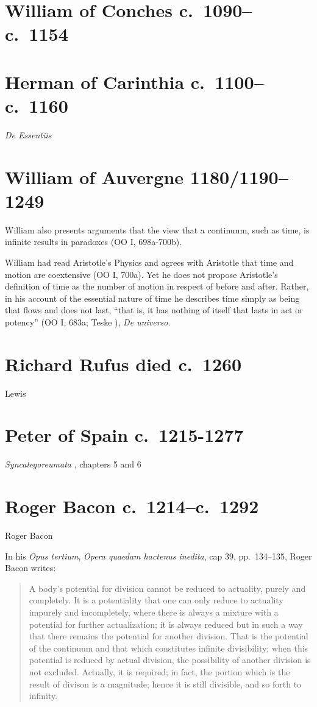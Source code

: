\documentclass{amsart}
\theoremstyle{definition}
\begin{document}
\section{William of Conches c.~1090--c.~1154}

\section{Herman of Carinthia c.~1100--c.~1160}
{\em De Essentiis} \cite[p.~252]{essentiis}


\section{William of Auvergne 1180/1190--1249}
William also presents arguments that the view that a continuum, such as time, is infinite results in paradoxes (OO I, 698a-700b).

William had read Aristotle's Physics and agrees with Aristotle that time and motion are coextensive (OO I, 700a). Yet he does not propose Aristotle's definition of time as the number of motion in respect of before and after. Rather, in his account of the essential nature of time he describes time simply as being that flows and does not last, ``that is, it has nothing of itself that lasts in act or potency'' (OO I, 683a; Teske \cite[p.~102]{teske}), {\em De universo}.




\section{Richard Rufus died c.~1260}
Lewis \cite{lewis2012}



\section{Peter of Spain c.~1215-1277}
{\em Syncategoreumata} \cite{hispanus}, chapters 5 and 6


\section{Roger Bacon c.~1214--c.~1292}
Roger Bacon \cite[p.~396]{grant1974}

In his {\em Opus tertium}, {\em Opera quaedam hactenus inedita}, cap 39, pp.~134--135, Roger Bacon writes:\cite[p.~46]{ariew}
\begin{quote}
A body's potential for division cannot be reduced to actuality, purely and completely. It is a potentiality that one can only reduce to actuality impurely and incompletely,
where there is always a mixture with a potential for further actualization; it is always reduced but in such a way that there remains the potential for another division.
That is the potential of the continuum and that which constitutes infinite divisibility; when this potential is reduced by actual division, the possibility of another division is not
excluded. Actually, it is required; in fact, the portion which is the result of divison is a magnitude; hence it is still divisible, and so forth to infinity.
\end{quote}
\end{document}
